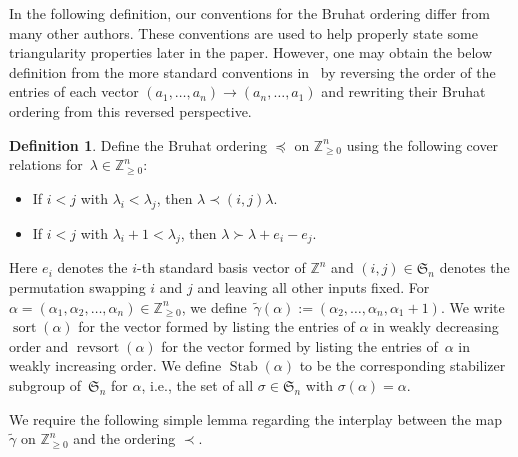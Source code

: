 \documentclass[pdftex]{sigma}
\numberwithin{equation}{section}
\theoremstyle{definition}
\newtheorem{Definition}[Theorem]{Definition}
\DeclareMathOperator{\sort}{sort}
\DeclareMathOperator{\revsort}{revsort}
\DeclareMathOperator{\Stab}{Stab}
\begin{document}
In the following definition, our conventions for the Bruhat ordering differ from many other authors. These conventions are used to help properly state some triangularity properties later in the paper. However, one may obtain the below definition from the more standard conventions in~\cite[Section~2.1]{haglund2007combinatorial} by reversing the order of the entries of each vector $(a_1,\dots, a_n) \rightarrow (a_n,\dots, a_1)$ and rewriting their Bruhat ordering from this reversed perspective.

\begin{Definition}\label{Bruhat def}
Define the Bruhat ordering $\preceq$ on $\mathbb{Z}_{\geq 0}^n$ using the following cover relations for~${\lambda \in \mathbb{Z}_{\geq 0}^{n}}$:
\begin{itemize}
\itemsep=0pt
 \item If $i<j$ with $\lambda_i < \lambda_j$, then $\lambda \prec (i,j)\lambda$.
 \item If $i<j$ with $\lambda_i + 1< \lambda_j$, then $\lambda \succ \lambda + e_i - e_j$.
\end{itemize}
 Here $e_i$ denotes the $i$-th standard basis vector of $\mathbb{Z}^{n}$ and $(i,j) \in \mathfrak{S}_n$ denotes the permutation swapping $i$ and $j$ and leaving all other inputs fixed. For $\alpha = (\alpha_1,\alpha_2,\dots, \alpha_n) \in \mathbb{Z}^{n}_{\geq 0}$, we define~${\widetilde{\gamma}(\alpha):= (\alpha_2,\dots, \alpha_n, \alpha_1 +1)}$. We write $\sort(\alpha)$ for the vector formed by listing the entries of $\alpha$ in weakly decreasing order and $\revsort(\alpha)$ for the vector formed by listing the entries of~$\alpha$ in weakly increasing order. We define $\Stab(\alpha)$ to be the corresponding stabilizer subgroup of~$\mathfrak{S}_n$ for $\alpha$, i.e., the set of all $\sigma \in \mathfrak{S}_n$ with $\sigma(\alpha) = \alpha$.
\end{Definition}

We require the following simple lemma regarding the interplay between the map $\widetilde{\gamma}$ on $\mathbb{Z}^n_{\geq 0}$ and the ordering $\prec$.
\end{document}
